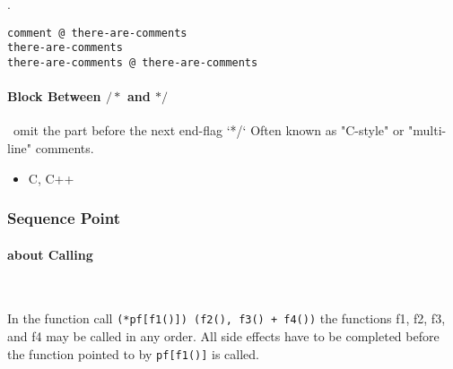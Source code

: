 .
\begin{lstlisting}[language={[x86masm]Assembler}]
comment @ there-are-comments
there-are-comments
there-are-comments @ there-are-comments
\end{lstlisting}


\paragraph{Block Between $/*$ and $*/$} \
omit the part before the next end-flag `*/`
Often known as "C-style" or "multi-line" comments.
\begin{itemize}
\item {C, C++}
\end{itemize}

\subsubsection{Sequence Point}

\paragraph{about Calling} \

In the function call \verb`(*pf[f1()]) (f2(), f3() + f4())` the functions f1, f2, f3, and f4 may be called in any order. All side effects have to be completed before the function pointed to by \verb`pf[f1()]` is called.
